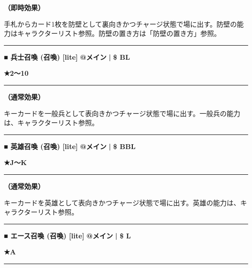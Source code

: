 \documentclass[twocolumn,a5paper,papersize,10pt]{jarticle}
\begin{document}
{\bf（即時効果）}

手札からカード1枚を防壁として裏向きかつチャージ状態で場に出す。防壁の能力はキャラクターリスト参照。防壁の置き方は「防壁の置き方」参照。
\vspace{2mm} %
\hrule height 0.5mm depth 0mm width 66.5mm %
\vspace{1mm} %
{\small\bf ■ 兵士召喚 {\scriptsize (召喚) [lite]}} %
\hfill 
{\footnotesize\bf @メイン }
  {\footnotesize\bf | } {\footnotesize\bf \$ BL}

{\footnotesize\bf ★2〜10}

\vspace{1mm}%
\hrule height 0.1mm depth 0mm width 66.5mm %
\vspace{1mm}%

{\bf（通常効果）}

キーカードを一般兵として表向きかつチャージ状態で場に出す。一般兵の能力は、キャラクターリスト参照。
\vspace{2mm} %
\hrule height 0.5mm depth 0mm width 66.5mm %
\vspace{1mm} %
{\small\bf ■ 英雄召喚 {\scriptsize (召喚) [lite]}} %
\hfill 
{\footnotesize\bf @メイン }
  {\footnotesize\bf | } {\footnotesize\bf \$ BBL}

{\footnotesize\bf ★J〜K}

\vspace{1mm}%
\hrule height 0.1mm depth 0mm width 66.5mm %
\vspace{1mm}%

{\bf（通常効果）}

キーカードを英雄として表向きかつチャージ状態で場に出す。英雄の能力は、キャラクターリスト参照。
\vspace{2mm} %
\hrule height 0.5mm depth 0mm width 66.5mm %
\vspace{1mm} %
{\small\bf ■ エース召喚 {\scriptsize (召喚) [lite]}} %
\hfill 
{\footnotesize\bf @メイン }
  {\footnotesize\bf | } {\footnotesize\bf \$ L}

{\footnotesize\bf ★A}

\vspace{1mm}%
\hrule height 0.1mm depth 0mm width 66.5mm %
\vspace{1mm}%
\end{document}
